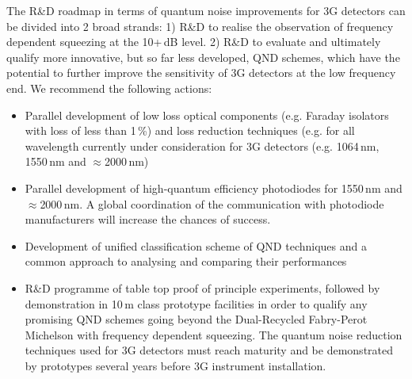 The R\&D roadmap in terms of quantum noise improvements for 3G detectors can be divided into 2 broad strands: 1) R\&D to realise the observation of frequency dependent squeezing at the 10+\,dB level. 2) R\&D to evaluate and ultimately qualify more innovative, but so far less developed, QND schemes, which have the potential to further improve the sensitivity of 3G detectors at the low frequency end.  
We recommend the following actions:
\begin{itemize}
    \item Parallel development of low loss optical components (e.g. Faraday isolators with loss of less than 1\,\%) and loss reduction techniques (e.g. for all wavelength currently under consideration for 3G detectors (e.g. 1064\,nm, 1550\,nm and $\approx$2000\,nm) 
    \item Parallel development of high-quantum efficiency photodiodes for 1550\,nm and $\approx$2000\,nm. A global coordination of the communication with photodiode manufacturers will increase the chances of success. 
    \item Development of unified classification scheme of QND techniques and a common approach to analysing and comparing their performances
    \item R\&D programme of table top proof of principle experiments, followed by demonstration in 10\,m class prototype facilities in order to qualify any promising QND schemes going beyond the Dual-Recycled Fabry-Perot Michelson with frequency dependent squeezing.  The quantum noise reduction techniques used for 3G detectors must reach maturity and be demonstrated by prototypes several years before 3G instrument installation.
\end{itemize}
 
 

